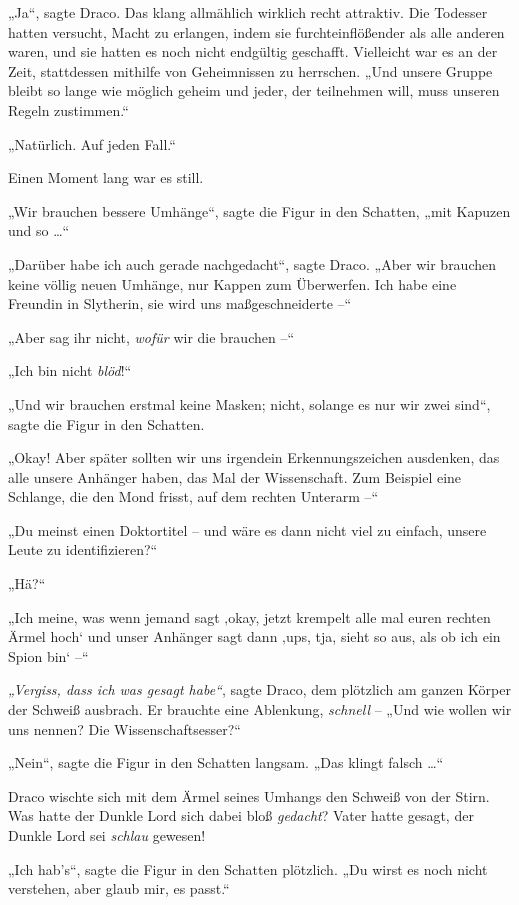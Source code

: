 „Ja“, sagte Draco. Das klang allmählich wirklich recht attraktiv. Die Todesser hatten versucht, Macht zu erlangen, indem sie furchteinflößender als alle anderen waren, und sie hatten es noch nicht endgültig geschafft. Vielleicht war es an der Zeit, stattdessen mithilfe von Geheimnissen zu herrschen. „Und unsere Gruppe bleibt so lange wie möglich geheim und jeder, der teilnehmen will, muss unseren Regeln zustimmen.“ 

„Natürlich. Auf jeden Fall.“ 

Einen Moment lang war es still. 

„Wir brauchen bessere Umhänge“, sagte die Figur in den Schatten, „mit Kapuzen und so …“ 

„Darüber habe ich auch gerade nachgedacht“, sagte Draco. „Aber wir brauchen keine völlig neuen Umhänge, nur Kappen zum Überwerfen. Ich habe eine Freundin in Slytherin, sie wird uns maßgeschneiderte –“ 

„Aber sag ihr nicht, \emph{wofür} wir die brauchen –“ 

„Ich bin nicht \emph{blöd}!“ 

„Und wir brauchen erstmal keine Masken; nicht, solange es nur wir zwei sind“, sagte die Figur in den Schatten. 

„Okay! Aber später sollten wir uns irgendein Erkennungszeichen ausdenken, das alle unsere Anhänger haben, das Mal der Wissenschaft. Zum Beispiel eine Schlange, die den Mond frisst, auf dem rechten Unterarm –“ 

„Du meinst einen Doktortitel – und wäre es dann nicht viel zu einfach, unsere Leute zu identifizieren?“ 

„Hä?“ 

„Ich meine, was wenn jemand sagt ‚okay, jetzt krempelt alle mal euren rechten Ärmel hoch‘ und unser Anhänger sagt dann ‚ups, tja, sieht so aus, als ob ich ein Spion bin‘ –“ 

\emph{„Vergiss, dass ich was gesagt habe“}, sagte Draco, dem plötzlich am ganzen Körper der Schweiß ausbrach. Er brauchte eine Ablenkung, \emph{schnell} – „Und wie wollen wir uns nennen? Die Wissenschaftsesser?“ 

„Nein“, sagte die Figur in den Schatten langsam. „Das klingt falsch …“ 

Draco wischte sich mit dem Ärmel seines Umhangs den Schweiß von der Stirn. Was hatte der Dunkle Lord sich dabei bloß \emph{gedacht}? Vater hatte gesagt, der Dunkle Lord sei \emph{schlau} gewesen! 

„Ich hab’s“, sagte die Figur in den Schatten plötzlich. „Du wirst es noch nicht verstehen, aber glaub mir, es passt.“ 

